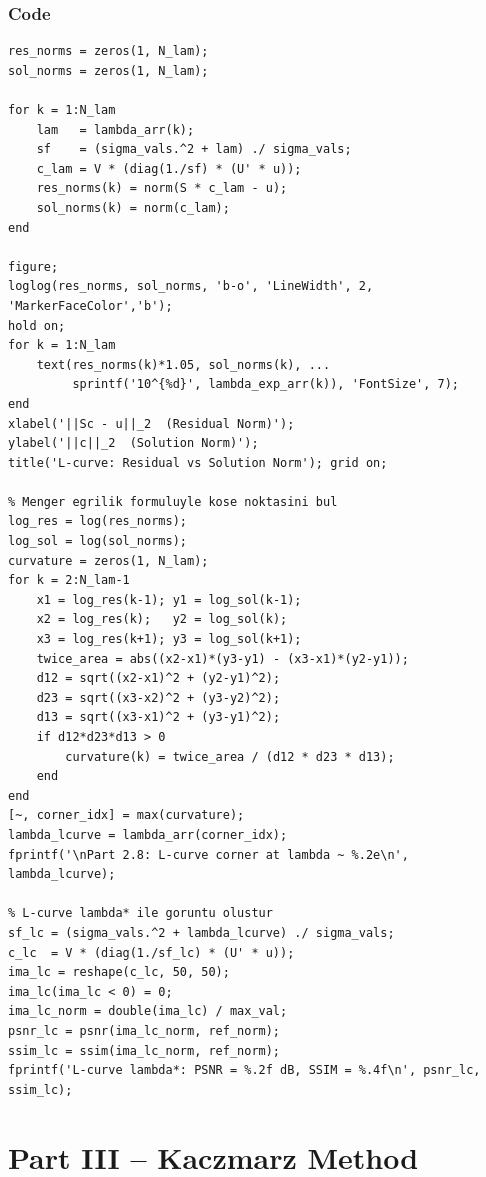 \documentclass[12pt,a4paper]{article}
\begin{document}
\subsubsection*{Code}
\begin{lstlisting}
res_norms = zeros(1, N_lam);
sol_norms = zeros(1, N_lam);

for k = 1:N_lam
    lam   = lambda_arr(k);
    sf    = (sigma_vals.^2 + lam) ./ sigma_vals;
    c_lam = V * (diag(1./sf) * (U' * u));
    res_norms(k) = norm(S * c_lam - u);
    sol_norms(k) = norm(c_lam);
end

figure;
loglog(res_norms, sol_norms, 'b-o', 'LineWidth', 2, 'MarkerFaceColor','b');
hold on;
for k = 1:N_lam
    text(res_norms(k)*1.05, sol_norms(k), ...
         sprintf('10^{%d}', lambda_exp_arr(k)), 'FontSize', 7);
end
xlabel('||Sc - u||_2  (Residual Norm)');
ylabel('||c||_2  (Solution Norm)');
title('L-curve: Residual vs Solution Norm'); grid on;

% Menger egrilik formuluyle kose noktasini bul
log_res = log(res_norms);
log_sol = log(sol_norms);
curvature = zeros(1, N_lam);
for k = 2:N_lam-1
    x1 = log_res(k-1); y1 = log_sol(k-1);
    x2 = log_res(k);   y2 = log_sol(k);
    x3 = log_res(k+1); y3 = log_sol(k+1);
    twice_area = abs((x2-x1)*(y3-y1) - (x3-x1)*(y2-y1));
    d12 = sqrt((x2-x1)^2 + (y2-y1)^2);
    d23 = sqrt((x3-x2)^2 + (y3-y2)^2);
    d13 = sqrt((x3-x1)^2 + (y3-y1)^2);
    if d12*d23*d13 > 0
        curvature(k) = twice_area / (d12 * d23 * d13);
    end
end
[~, corner_idx] = max(curvature);
lambda_lcurve = lambda_arr(corner_idx);
fprintf('\nPart 2.8: L-curve corner at lambda ~ %.2e\n', lambda_lcurve);

% L-curve lambda* ile goruntu olustur
sf_lc = (sigma_vals.^2 + lambda_lcurve) ./ sigma_vals;
c_lc  = V * (diag(1./sf_lc) * (U' * u));
ima_lc = reshape(c_lc, 50, 50);
ima_lc(ima_lc < 0) = 0;
ima_lc_norm = double(ima_lc) / max_val;
psnr_lc = psnr(ima_lc_norm, ref_norm);
ssim_lc = ssim(ima_lc_norm, ref_norm);
fprintf('L-curve lambda*: PSNR = %.2f dB, SSIM = %.4f\n', psnr_lc, ssim_lc);
\end{lstlisting}

\newpage
\section{Part III -- Kaczmarz Method}
\end{document}
